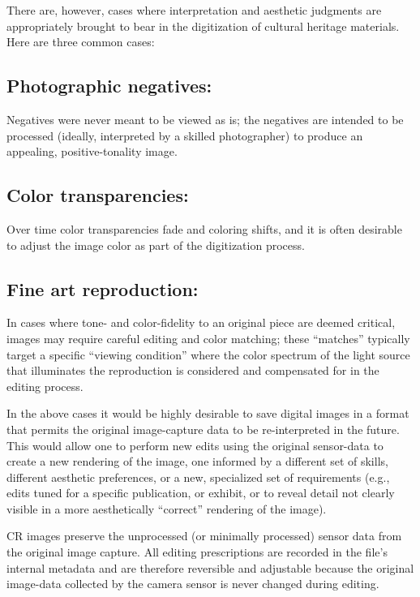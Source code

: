 \documentclass[11pt,a4paper]{article}
\begin{document}
There are, however, cases where interpretation and aesthetic judgments are appropriately brought to bear in the digitization of cultural heritage materials. Here are three common cases:
\subsection{Photographic negatives:}
Negatives were never meant to be viewed as is; the negatives are intended to be processed (ideally, interpreted by a skilled photographer) to produce an appealing, positive-tonality image.

\subsection{Color transparencies:}
Over time color transparencies fade and coloring shifts, and it is often desirable to adjust the image color as part of the digitization process.

\subsection{Fine art reproduction:}
In cases where tone- and color-fidelity to an original piece are deemed critical, images may require careful editing and color matching; these “matches” typically target a specific “viewing condition” where the color spectrum of the light source that illuminates the reproduction is considered and compensated for in the editing process.

In the above cases it would be highly desirable to save digital images in a format that permits the original image-capture data to be re-interpreted in the future. This would allow one to perform new edits using the original sensor-data to create a new rendering of the image, one informed by a different set of skills, different aesthetic preferences, or a new, specialized set of requirements (e.g., edits tuned for a specific publication, or exhibit, or to reveal detail not clearly visible in a more aesthetically “correct” rendering of the image).

CR images preserve the unprocessed (or minimally processed) sensor data from the original image capture. All editing prescriptions are recorded in the file’s internal metadata and are therefore reversible and adjustable because the original image-data collected by the camera sensor is never changed during editing.
\end{document}

